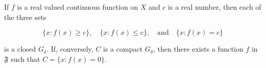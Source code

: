 If $f$ is a real valued continuous function on $X$ and $c$ is a real number, then each of the three sets

$$\{x: f(x) \geq c\}, \quad \{x: f(x) \leq c\}, \quad \text{and} \quad \{x: f(x) = c\}$$

is a closed $G_\delta$. If, conversely, $C$ is a compact $G_\delta$, then there exists a function $f$ in $\mathfrak{F}$ such that $C = \{x: f(x) = 0\}$.
